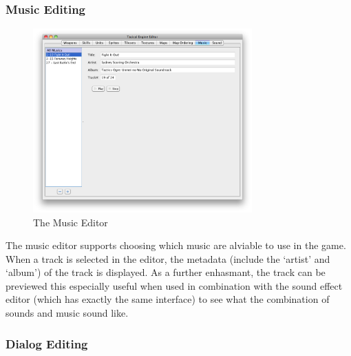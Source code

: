 \subsubsection{Music Editing}
\begin{figure}[htb]
	\centering
		\includegraphics[width=0.75\textwidth]{figures/editor/Music.png}
	\caption{The Music Editor}
	\label{fig:figures_editor_Music}
\end{figure}
The music editor supports choosing which music are alviable to use in the game.  When a track is selected in the editor, the metadata (include the `artist' and `album') of the track is displayed.  As a further enhasmant, the track can be previewed this especially useful when used in combination with the  sound effect editor (which has exactly the same interface) to see what the combination of sounds and music sound like. 


\clearpage
\subsubsection{Dialog Editing}
\label{ssub:dialog_editing}

